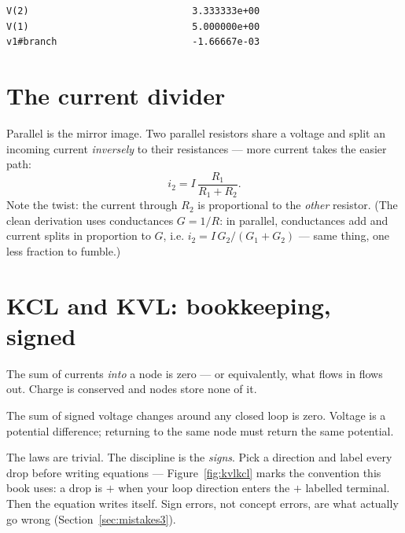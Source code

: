 \begin{lstlisting}[language={},caption={ngspice output of \texttt{code/ch03\_divider.cir}, verbatim (simulation S1).},label=lst:dividerop]
V(2)                             3.333333e+00
V(1)                             5.000000e+00
v1#branch                        -1.66667e-03
\end{lstlisting}

\section{The current divider}
\label{sec:curdiv}

Parallel is the mirror image. Two parallel resistors share a voltage and split
an incoming current \emph{inversely} to their resistances — more current takes
the easier path:
\[
i_2 = I\,\frac{R_1}{R_1+R_2}.
\]
Note the twist: the current through $R_2$ is proportional to the
\emph{other} resistor. (The clean derivation uses conductances
$G=1/R$: in parallel, conductances add and current splits
in proportion to $G$, i.e. $i_2 = I\,G_2/(G_1+G_2)$ — same thing, one less
fraction to fumble.)

\section{KCL and KVL: bookkeeping, signed}
\label{sec:klaws}

\begin{definition}
The sum of currents \emph{into} a node is zero — or equivalently, what flows
in flows out. Charge is conserved and nodes store none of it.
\end{definition}

\begin{definition}
The sum of signed voltage changes around any closed loop is zero. Voltage is
a potential difference; returning to the same node must return the same
potential.
\end{definition}

The laws are trivial. The discipline is the \emph{signs}. Pick a direction and
label every drop before writing equations — Figure~\ref{fig:kvlkcl} marks the
convention this book uses: a drop is $+$ when your loop direction enters the
$+$ labelled terminal. Then the equation writes itself. Sign errors, not
concept errors, are what actually go wrong (Section~\ref{sec:mistakes3}).

